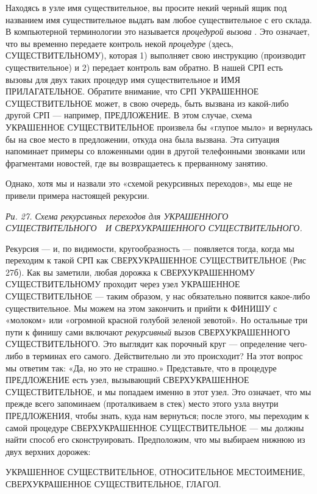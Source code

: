 Находясь в узле имя существительное, вы просите некий черный ящик под названием имя существительное выдать вам любое существительное с его склада. В компьютерной терминологии это называется \emph{процедурой вызова} . Это означает, что вы временно передаете контроль некой \emph{процедуре} (здесь, СУЩЕСТВИТЕЛЬНОМУ), которая 1) выполняет свою инструкцию (производит существительное) и 2) передает контроль вам обратно. В нашей СРП есть вызовы для двух таких процедур имя существительное и ИМЯ ПРИЛАГАТЕЛЬНОЕ. Обратите внимание, что СРП УКРАШЕННОЕ СУЩЕСТВИТЕЛЬНОЕ может, в свою очередь, быть вызвана из какой-либо другой СРП --- например, ПРЕДЛОЖЕНИЕ. В этом случае, схема УКРАШЕННОЕ СУЩЕСТВИТЕЛЬНОЕ произвела бы «глупое мыло» и вернулась бы на свое место в предложении, откуда она была вызвана. Эта ситуация напоминает примеры со вложенными один в другой телефонными звонками или фрагментами новостей, где вы возвращаетесь к прерванному занятию.

Однако, хотя мы и назвали это «схемой рекурсивных переходов», мы еще не привели примера настоящей рекурсии.

\emph{Ри. 27. Схема рекурсивных переходов для УКРАШЕННОГО СУЩЕСТВИТЕЛЬНОГО~~И СВЕРХУКРАШЕННОГО СУЩЕСТВИТЕЛЬНОГО.}

Рекурсия --- и, по видимости, кругообразность --- появляется тогда, когда мы переходим к такой СРП как СВЕРХУКРАШЕННОЕ СУЩЕСТВИТЕЛЬНОЕ (Рис 27б). Как вы заметили, любая дорожка к СВЕРХУКРАШЕННОМУ СУЩЕСТВИТЕЛЬНОМУ проходит через узел УКРАШЕННОЕ СУЩЕСТВИТЕЛЬНОЕ --- таким образом, у нас обязательно появится какое-либо существительное. Мы можем на этом закончить и прийти к ФИНИШУ с «молоком» или «огромной красной голубой зеленой зевотой». Но остальные три пути к финишу сами включают \emph{рекурсивный} вызов СВЕРХУКРАШЕННОГО СУЩЕСТВИТЕЛЬНОГО. Это выглядит как порочный круг --- определение чего-либо в терминах его самого. Действительно ли это происходит? На этот вопрос мы ответим так: «Да, но это не страшно.» Представьте, что в процедуре ПРЕДЛОЖЕНИЕ есть узел, вызывающий СВЕРХУКРАШЕННОЕ СУЩЕСТВИТЕЛЬНОЕ, и мы попадаем именно в этот узел. Это означает, что мы прежде всего запоминаем (проталкиваем в стек) место этого узла внутри ПРЕДЛОЖЕНИЯ, чтобы знать, куда нам вернуться; после этого, мы переходим к самой процедуре СВЕРХУКРАШЕННОЕ СУЩЕСТВИТЕЛЬНОЕ --- мы должны найти способ его сконструировать. Предположим, что мы выбираем нижнюю из двух верхних дорожек:

УКРАШЕННОЕ СУЩЕСТВИТЕЛЬНОЕ, ОТНОСИТЕЛЬНОЕ МЕСТОИМЕНИЕ, СВЕРХУКРАШЕННОЕ СУЩЕСТВИТЕЛЬНОЕ, ГЛАГОЛ.

